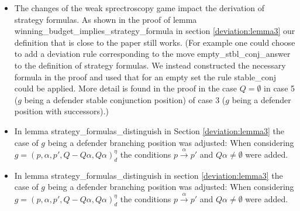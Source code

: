 \begin{itemize}
    \item The changes of the weak sprectroscopy game impact the derivation of strategy formulas. As shown in the proof 
    of lemma winning\_budget\_implies\_strategy\_formula in section \ref{deviation:lemma3} our definition that is close 
    to the paper still works. (For example one could choose to add a deviation rule corresponding to the move empty\_stbl\_conj\_answer to the definition 
    of strategy formulas. We instead constructed the necessary formula in the proof and used that for an empty set the rule stable\_conj could be applied.
    More detail is found in the proof in the case $Q=\emptyset$ in case 5 ($g$ being a defender stable conjunction position) 
    of case 3 ($g$ being a defender position with successors).)
    \item In lemma strategy\_formulas\_distinguish in Section \ref{deviation:lemma3} the case of $g$ being a defender branching position was adjusted: 
    When considering $g=(p,\alpha ,p', Q- Q \alpha, Q \alpha)_d^\eta$ the conditions $p \overset{\alpha}{\longrightarrow} p'$ and $Q \alpha \neq \emptyset$ were 
    added. 
    \item In lemma strategy\_formulas\_distinguish in section \ref{deviation:lemma3} the case of $g$ being a defender branching position was adjusted: 
    When considering $g=(p,\alpha ,p', Q- Q \alpha, Q \alpha)_d^\eta$ the conditions $p \overset{\alpha}{\longrightarrow} p'$ and $Q \alpha \neq \emptyset$ were added. 
\end{itemize}
